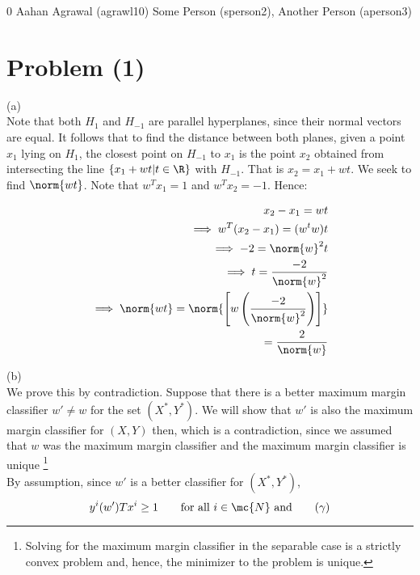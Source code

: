\documentclass[../main.tex]{subfiles}
\begin{document}
\homework
    {0}
    {Aahan Agrawal (agrawl10)}
    {Some Person (sperson2), Another Person (aperson3)}

\section*{Problem (1)}

(a) \\

Note that both $H_{1}$ and $H_{-1}$ are parallel hyperplanes, since their normal vectors are equal. It follows that to find the distance between both planes, given a point $x_1$ lying on $H_{1}$, the closest point on $H_{-1}$ to $x_1$ is the point $x_2$ obtained from intersecting the line $\{x_1 + wt | t \in \R\}$ with $H_{-1}$. That is $x_2 = x_1 + wt$. We seek to find $\norm{wt}$. Note that $w^Tx_1 = 1$ and $w^Tx_2 = -1$. Hence:

\begin{align*}
    x_2 - x_1 = wt \\
    \implies w^T(x_2 - x_1) = (w^tw)t \\
    \implies -2 = \norm{w}^2 t \\
    \implies t = \frac{-2}{\norm{w}^2} \\
    \implies \norm{wt} = \norm{\left[ w\left( \frac{-2}{\norm{w}^2} \right) \right]} \\
    = \frac{2}{\norm{w}}
\end{align*}

(b) \\

We prove this by contradiction. Suppose that there is a better maximum margin classifier $w' \not = w$ for the set $(X^{\ast}, Y^{\ast})$. We will show that $w'$ is also the maximum margin
classifier for $(X,Y)$ then, which is a contradiction, since we assumed that $w$ was the maximum margin classifier and the maximum margin classifier is unique \footnote{Solving for the maximum margin classifier in the separable case is a strictly convex problem and, hence, the minimizer to the problem is unique.} \\

By assumption, since $w'$ is a better classifier for $(X^{\ast}, Y^{\ast})$, \\

\[
    y^{i}(w')Tx^{i} \geq 1 \qquad \text{for all $i \in \mc{N}$ and} \tag{$\gamma$}
\]
\end{document}
